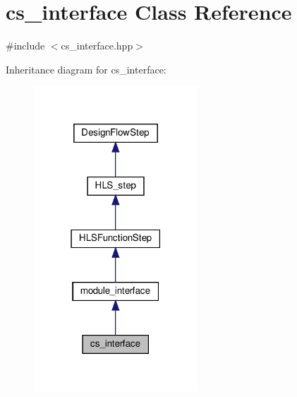 \hypertarget{classcs__interface}{}\section{cs\+\_\+interface Class Reference}
\label{classcs__interface}


{\ttfamily \#include $<$cs\+\_\+interface.\+hpp$>$}



Inheritance diagram for cs\+\_\+interface\+:
\nopagebreak
\begin{figure}[H]
\begin{center}
\leavevmode
\includegraphics[width=174pt]{d5/de6/classcs__interface__inherit__graph}
\end{center}
\end{figure}


